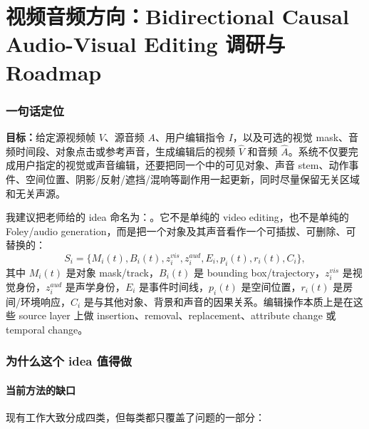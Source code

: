 \part*{视频音频方向：Bidirectional Causal Audio-Visual Editing 调研与 Roadmap}

\section{一句话定位}

\begin{conceptbox}
\textbf{目标：}给定源视频帧 $V$、源音频 $A$、用户编辑指令 $I$，以及可选的视觉 mask、音频时间段、对象点击或参考声音，生成编辑后的视频 $\hat V$ 和音频 $\hat A$。系统不仅要完成用户指定的视觉或声音编辑，还要把同一个中的可见对象、声音 stem、动作事件、空间位置、阴影/反射/遮挡/混响等副作用一起更新，同时尽量保留无关区域和无关声源。
\end{conceptbox}

我建议把老师给的 idea 命名为：。它不是单纯的 video editing，也不是单纯的 Foley/audio generation，而是把一个对象及其声音看作一个可插拔、可删除、可替换的：
\[
S_i = \{M_i(t), B_i(t), z_i^{vis}, z_i^{aud}, E_i, p_i(t), r_i(t), C_i\},
\]
其中 $M_i(t)$ 是对象 mask/track，$B_i(t)$ 是 bounding box/trajectory，$z_i^{vis}$ 是视觉身份，$z_i^{aud}$ 是声学身份，$E_i$ 是事件时间线，$p_i(t)$ 是空间位置，$r_i(t)$ 是房间/环境响应，$C_i$ 是与其他对象、背景和声音的因果关系。编辑操作本质上是在这些 source layer 上做 insertion、removal、replacement、attribute change 或 temporal change。

\section{为什么这个 idea 值得做}

\subsection{当前方法的缺口}

现有工作大致分成四类，但每类都只覆盖了问题的一部分：

